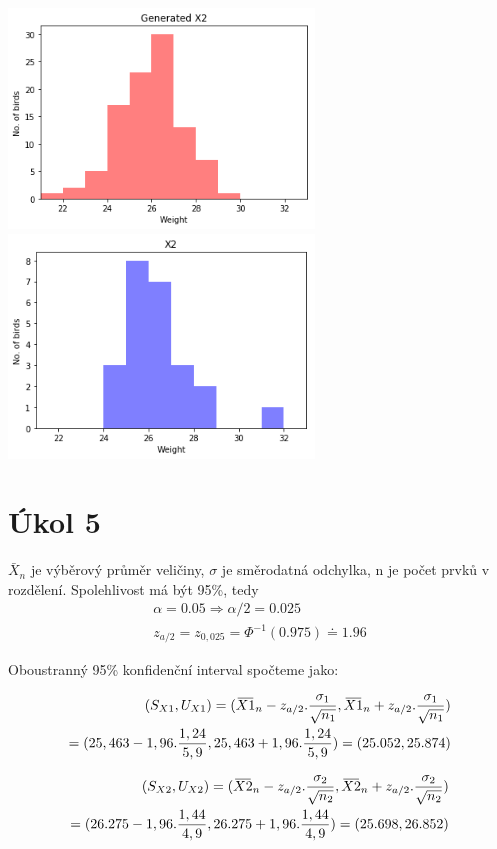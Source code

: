 \documentclass[12pt,a4paper]{article}
\newcommand{\overbar}[1]{\mkern 2.5mu\overline{\mkern-2.5mu#1\mkern-2.5mu}\mkern 2.5mu}
\begin{document}
\includegraphics[width=3.2in]{4_Died_Gen}
\includegraphics[width=3.2in]{4_Died_Data}

\par \bigskip

\section{Úkol 5}

$\bar{X}_n$ je výběrový průměr veličiny, $\sigma$ je směrodatná odchylka, n je počet prvků v rozdělení. Spolehlivost má být 95\%, tedy 
\begin{align*}
\alpha = 0.05 \Rightarrow \alpha/2 = 0.025 \\
z_{a/2} = z_{0,025} = \Phi^{-1}(0.975) \doteq 1.96
\end{align*}

Oboustranný 95\% konfidenční interval spočteme jako:

\begin{align}
(S_{X1},U_{X1}) = (\overbar{X1}_n - z_{a/2}.\frac{\sigma_1}{\sqrt{n_1}}, \overbar{X1}_n + z_{a/2}.\frac{\sigma_1}{\sqrt{n_1}}) \nonumber\\
= (25,463 - 1,96.\frac{1,24}{5,9}, 25,463 + 1,96.\frac{1,24}{5,9}) = (25.052, 25.874)
\end{align}

\begin{align}
(S_{X2},U_{X2}) = (\overbar{X2}_n - z_{a/2}.\frac{\sigma_2}{\sqrt{n_2}}, \overbar{X2}_n + z_{a/2}.\frac{\sigma_2}{\sqrt{n_2}}) \nonumber\\
= (26.275 - 1,96.\frac{1,44}{4,9}, 26.275 + 1,96.\frac{1,44}{4,9}) = (25.698, 26.852)
\end{align}
\end{document}
